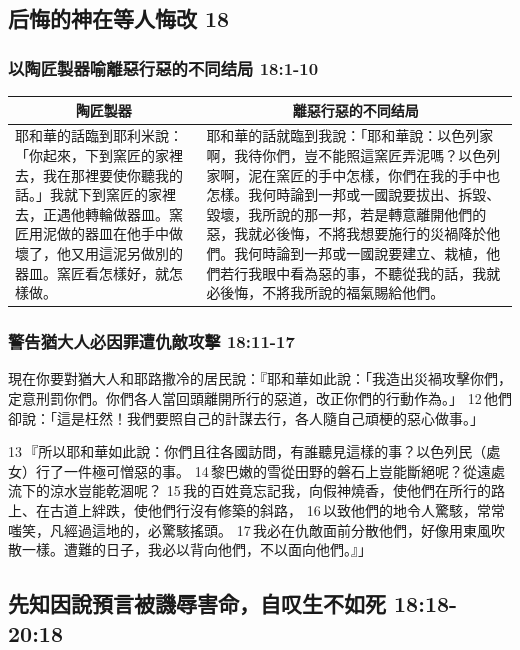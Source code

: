 \subsection{后悔的神在等人悔改 18}
\subsubsection{以陶匠製器喻離惡行惡的不同结局 18:1-10}
\begin{table}[H]
\centering
\begin{tabular}{p{}|p{11.0cm}}\hline\hline
\multicolumn{1}{c|}{陶匠製器}&\multicolumn{1}{c}{離惡行惡的不同结局}\\\hline
耶和華的話臨到耶利米說：「你起來，下到窯匠的家裡去，我在那裡要使你聽我的話。」我就下到窯匠的家裡去，正遇他轉輪做器皿。窯匠用泥做的器皿在他手中做壞了，他又用這泥另做別的器皿。窯匠看怎樣好，就怎樣做。
&耶和華的話就臨到我說：「耶和華說：以色列家啊，我待你們，豈不能照這窯匠弄泥嗎？以色列家啊，泥在窯匠的手中怎樣，你們在我的手中也怎樣。我何時論到一邦或一國說要拔出、拆毀、毀壞，我所說的那一邦，若是轉意離開他們的惡，我就必後悔，不將我想要施行的災禍降於他們。我何時論到一邦或一國說要建立、栽植，他們若行我眼中看為惡的事，不聽從我的話，我就必後悔，不將我所說的福氣賜給他們。\\\hline
\end{tabular}
\end{table}




\subsubsection{警告猶大人必因罪遭仇敵攻擊 18:11-17}
現在你要對猶大人和耶路撒冷的居民說：『耶和華如此說：「我造出災禍攻擊你們，定意刑罰你們。你們各人當回頭離開所行的惡道，改正你們的行動作為。」 12 他們卻說：「這是枉然！我們要照自己的計謀去行，各人隨自己頑梗的惡心做事。」

13 『所以耶和華如此說：你們且往各國訪問，有誰聽見這樣的事？以色列民（處女）行了一件極可憎惡的事。 14 黎巴嫩的雪從田野的磐石上豈能斷絕呢？從遠處流下的涼水豈能乾涸呢？ 15 我的百姓竟忘記我，向假神燒香，使他們在所行的路上、在古道上絆跌，使他們行沒有修築的斜路， 16 以致他們的地令人驚駭，常常嗤笑，凡經過這地的，必驚駭搖頭。 17 我必在仇敵面前分散他們，好像用東風吹散一樣。遭難的日子，我必以背向他們，不以面向他們。』」

\subsection{先知因說預言被譏辱害命，自叹生不如死 18:18-20:18}
